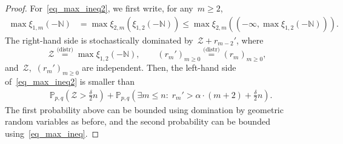 \documentclass[pdflatex,sn-mathphys-num]{sn-jnl}%
\newcommand{\bbN}{{\ensuremath{\mathbb N}} }
\newcommand{\bbP}{{\ensuremath{\mathbb P}} }
\newcommand{\1}{{\ensuremath{\mathbf{1}}} }
\theoremstyle{thmstyleone}%
\theoremstyle{thmstyletwo}%
\theoremstyle{thmstylethree}%
\begin{document}
\begin{proof}
	For~\eqref{eq_max_ineq2}, we first write, for any~$m \ge 2$,
	\begin{align*}
		\max\xi_{1,m}({-\bbN}) &= \max \xi_{2,m}(\xi_{1,2}({-\bbN})) \le \max \xi_{2,m}((-\infty, \max \xi_{1,2}({-\bbN}))).
	\end{align*}
 The right-hand side is stochastically dominated by~$\mathcal Z + r_{m-2}'$, where 
	\[\mathcal Z \stackrel{\text{(distr)}}{=} \max \xi_{1,2}({-\bbN}),\qquad (r_m')_{m \ge 0} \stackrel{\text{(distr)}}{=} (r_m)_{m \ge 0},\]
	and~$\mathcal Z$,~$(r_m')_{m \ge 0}$ are independent. Then, the left-hand side of~\eqref{eq_max_ineq2} is smaller than
	\begin{align*}
		&\bbP_{p,q}\left(\mathcal Z > \frac{\delta}{2}n \right) + \bbP_{p,q}\left(\exists m{\le n} :\; r_{m}' > \alpha \cdot (m+2) + \frac{\delta}{2} n  \right).
	\end{align*}
	The first probability above can be bounded using domination by geometric random variables as before, and the second probability can be bounded using~\eqref{eq_max_ineq}.
\end{proof}
\end{document}
